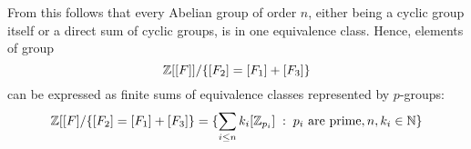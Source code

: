 From this follows that every Abelian group of order $n$, either being a cyclic group itself or a direct sum of cyclic groups, is in one equivalence class. Hence, elements of group
$$\operatorname{\mathbb{Z}}[[F]]/\{[F_2]=[F_1]+[F_3]\}$$
can be expressed as finite sums of equivalence classes represented by $p$-groups:
$$\operatorname{\mathbb{Z}}[[F]/\{[F_2]=[F_1]+[F_3]\}=\{\sum_{i\leq n} k_i[\operatorname{\mathbb{Z}}_{p_i}]\;:\;p_i\text{ are prime}, n,k_i\in\operatorname{\mathbb{N}}\}$$

